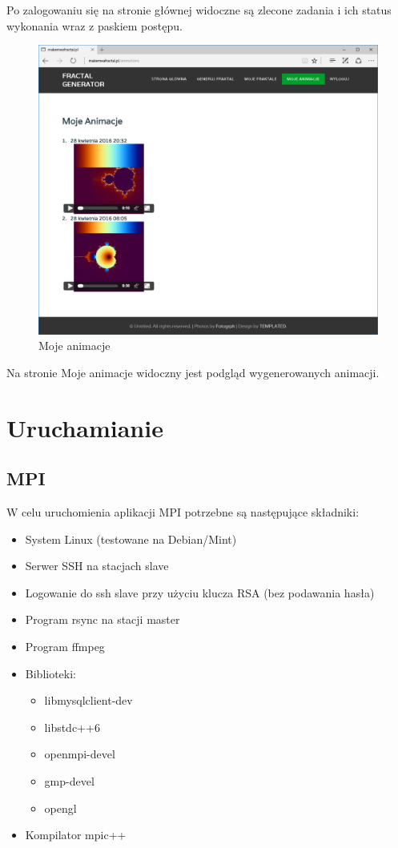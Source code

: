 \documentclass[a4paper]{article}
\begin{document}
Po zalogowaniu się na stronie głównej widoczne są zlecone zadania i ich status wykonania wraz z paskiem postępu.
\begin{figure}[H]
    \centering
    \includegraphics[width=\textwidth]{my_frac.png}
    \caption{Moje animacje}
    \label{fig:my_frac}
\end{figure}
Na stronie Moje animacje widoczny jest podgląd wygenerowanych animacji.

\newpage

\section{Uruchamianie}

\subsection{MPI}
W celu uruchomienia aplikacji MPI potrzebne są następujące składniki:
\begin{itemize}
\item System Linux (testowane na Debian/Mint)
\item Serwer SSH na stacjach slave
\item Logowanie do ssh slave przy użyciu klucza RSA (bez podawania hasła)
\item Program rsync na stacji master
\item Program ffmpeg
\item Biblioteki:
\begin{itemize}
\item libmysqlclient-dev
\item libstdc++6
\item openmpi-devel
\item gmp-devel
\item opengl
\end{itemize}
\item Kompilator mpic++
\end{itemize}
\end{document}
